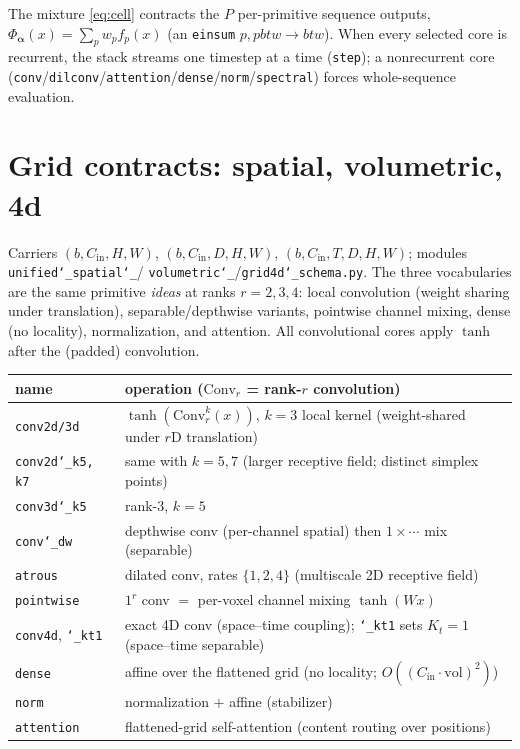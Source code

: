 \documentclass[11pt]{article}
\newcommand{\allowbreakhere}{\discretionary{}{}{}}
\newcommand{\code}[1]{\texttt{\def\_{\char`_\allowbreakhere}#1}}
\newcommand{\alphapar}{\bm{\alpha}}
\newcommand{\Cin}{C_{\mathrm{in}}}
\begin{document}
\noindent The mixture \eqref{eq:cell} contracts the $P$ per-primitive sequence outputs,
$\Phi_{\alphapar}(x)=\sum_p w_p f_p(x)$ (an \code{einsum} $p,pbtw\!\to\!btw$). When every selected core is
recurrent, the stack streams one timestep at a time (\code{step}); a nonrecurrent core
(\code{conv}/\code{dilconv}/\code{attention}/\code{dense}/\code{norm}/\code{spectral}) forces whole-sequence
evaluation.

\section{Grid contracts: spatial, volumetric, 4d}
\label{sec:grid}

Carriers $(b,\Cin,H,W)$, $(b,\Cin,D,H,W)$, $(b,\Cin,T,D,H,W)$; modules \code{unified\_spatial\_}/
\code{volumetric\_}/\code{grid4d\_schema.py}. The three vocabularies are the same primitive \emph{ideas} at
ranks $r=2,3,4$: local convolution (weight sharing under translation), separable/depthwise variants,
pointwise channel mixing, dense (no locality), normalization, and attention. All convolutional cores apply
$\tanh$ after the (padded) convolution.

\begin{center}
\footnotesize
\renewcommand{\arraystretch}{1.3}
\begin{tabular}{@{}p{2.3cm}p{10.6cm}@{}}
\toprule
name & operation ($\mathrm{Conv}_r$ = rank-$r$ convolution)\\
\midrule
\code{conv2d/3d}         & $\tanh(\mathrm{Conv}_r^{k}(x))$, $k{=}3$ local kernel (weight-shared under $r$D translation)\\
\code{conv2d\_k5,\,k7}    & same with $k{=}5,7$ (larger receptive field; distinct simplex points)\\
\code{conv3d\_k5}         & rank-3, $k{=}5$\\
\code{conv\_dw}          & depthwise conv (per-channel spatial) then $1{\times}\!\cdots$ mix (separable)\\
\code{atrous}            & dilated conv, rates $\{1,2,4\}$ (multiscale 2D receptive field)\\
\code{pointwise}         & $1^r$ conv $=$ per-voxel channel mixing $\tanh(Wx)$\\
\code{conv4d}, \code{\_kt1}& exact 4D conv (space--time coupling); \code{\_kt1} sets $K_t{=}1$ (space--time separable)\\
\code{dense}             & affine over the flattened grid (no locality; $O((\Cin\!\cdot\!\text{vol})^2)$)\\
\code{norm}              & normalization $+$ affine (stabilizer)\\
\code{attention}         & flattened-grid self-attention (content routing over positions)\\
\bottomrule
\end{tabular}
\end{center}
\end{document}
